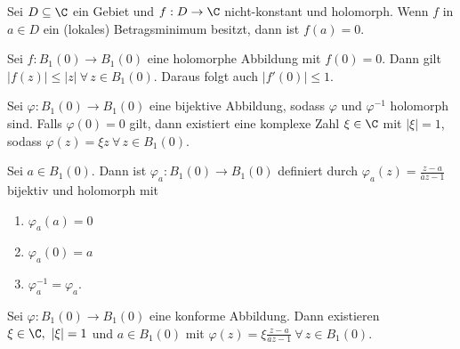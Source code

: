 		\begin{corn}[Minimumsprinzip]
			Sei $ D \subseteq \C $ ein Gebiet und $ f: D \to \C $ nicht-konstant und holomorph. Wenn $ f $ in $ a \in D $ ein (lokales) Betragsminimum besitzt, dann ist $f(a) = 0$.
		\end{corn}
		
		\begin{thmn}
			Sei $ f: B_1(0) \to B_1(0) $ eine holomorphe Abbildung mit $f(0)=0$. Dann gilt $ |f(z)| \leq |z|\ \forall\, z \in B_1(0) $. Daraus folgt auch $ |f'(0)| \leq 1 $.
		\end{thmn}
		
		\begin{lem}
			Sei $ \varphi: B_1(0) \to B_1(0) $ eine bijektive Abbildung, sodass $ \varphi $ und $ \varphi^{-1} $ holomorph sind. Falls $ \varphi(0)=0 $ gilt, dann existiert eine komplexe Zahl $ \xi \in \C $ mit $ |\xi|=1 $, sodass $ \varphi(z) = \xi z \ \forall\, z \in B_1(0). $
		\end{lem}
		
		\begin{lem}
			Sei $ a \in B_1(0) $. Dann ist $ \varphi_a: B_1(0) \to B_1(0) $ definiert durch $ \varphi_a(z) = \frac{z-a}{\overbar{a}z-1} $ bijektiv und holomorph mit 
			\begin{enumerate}[label={\roman*})]
				\item $\varphi_a(a)=0$
				\item $ \varphi_a(0)=a $
				\item $ \varphi_a^{-1} = \varphi_a. $
			\end{enumerate}
		\end{lem}
		
		\begin{thm}
			Sei $ \varphi: B_1(0) \to B_1(0) $ eine konforme Abbildung. Dann existieren $ \xi \in \C,\ |\xi| = 1 $ und $ a \in B_1(0) $ mit $ \varphi(z) = \xi \frac{z-a}{\overbar{a}z-1}\ \forall\, z \in B_1(0) $.
		\end{thm}